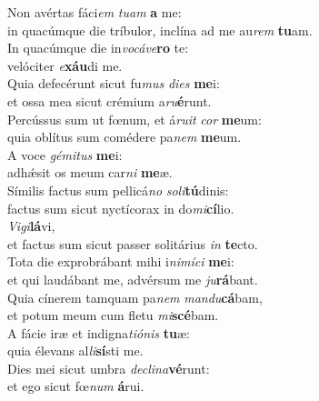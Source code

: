 \evenverse Non avértas fáci\textit{em} \textit{tu}\textit{am} \textbf{a} me:~\*\\
\evenverse in quacúmque die tríbulor, inclína ad me au\textit{rem} \textbf{tu}am.\\
\oddverse In quacúmque die in\textit{vo}\textit{cá}\textit{ve}\textbf{ro} te:~\*\\
\oddverse velóciter \textit{e}\textbf{xáu}di me.\\
\evenverse Quia defecérunt sicut fu\textit{mus} \textit{di}\textit{es} \textbf{me}i:~\*\\
\evenverse et ossa mea sicut crémium a\textit{ru}\textbf{é}runt.\\
\oddverse Percússus sum ut fœnum, et á\textit{ru}\textit{it} \textit{cor} \textbf{me}um:~\*\\
\oddverse quia oblítus sum comédere pa\textit{nem} \textbf{me}um.\\
\evenverse A voce \textit{gé}\textit{mi}\textit{tus} \textbf{me}i:~\*\\
\evenverse adhǽsit os meum car\textit{ni} \textbf{me}æ.\\
\oddverse Símilis factus sum pellicá\textit{no} \textit{so}\textit{li}\textbf{tú}dinis:~\*\\
\oddverse factus sum sicut nyctícorax in do\textit{mi}\textbf{cí}lio.\\
\evenverse \textit{Vi}\textit{gi}\textbf{lá}vi,~\*\\
\evenverse et factus sum sicut passer solitárius \textit{in} \textbf{te}cto.\\
\oddverse Tota die exprobrábant mihi i\textit{ni}\textit{mí}\textit{ci} \textbf{me}i:~\*\\
\oddverse et qui laudábant me, advérsum me \textit{ju}\textbf{rá}bant.\\
\evenverse Quia cínerem tamquam pa\textit{nem} \textit{man}\textit{du}\textbf{cá}bam,~\*\\
\evenverse et potum meum cum fletu \textit{mi}\textbf{scé}bam.\\
\oddverse A fácie iræ et indigna\textit{ti}\textit{ó}\textit{nis} \textbf{tu}æ:~\*\\
\oddverse quia élevans al\textit{li}\textbf{sí}sti me.\\
\evenverse Dies mei sicut umbra \textit{de}\textit{cli}\textit{na}\textbf{vé}runt:~\*\\
\evenverse et ego sicut fœ\textit{num} \textbf{á}rui.\\
